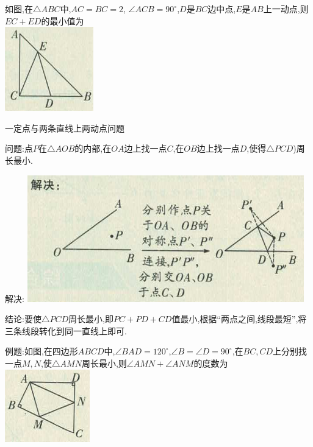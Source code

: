 \documentclass[cn,blue,12pt]{elegantbook}
\renewcommand \tkt[1]{{\CJKunderline[hidden=true, skip=true, thickness=1pt]{#1}}}
\begin{document}
\begin{zsyd}
\begin{zsyd}
    \item 如图,在\( \triangle ABC \)中,\(AC = BC = 2\), \(\angle ACB=90^\circ\),\(D\)是\(BC\)边中点,\(E\)是\(AB\)上一动点,则\(EC + ED\)的最小值为\tkt{\qquad}\\
        \includegraphics[width=0.3\linewidth]{pic/20200518005.png}
    \end{zsyd}
\item 一定点与两条直线上两动点问题
    \begin{zsyd}
    \item 问题:点\(P\)在\(\triangle AOB\)的内部,在\(OA\)边上找一点\(C\),在\(OB\)边上找一点\(D\),使得\(\triangle PCD\))周长最小.
    \item 解决:
        \includegraphics[width=0.6\linewidth]{pic/20200518003.png}
    \item 结论:要使\(\triangle PCD\)周长最小,即\(PC + PD + CD\)值最小,根据“两点之间,线段最短”,将三条线段转化到同一直线上即可.
    \item 例题:如图,在四边形\(ABCD\)中,\(\angle BAD = 120^\circ\),\(\angle B = \angle D=90^\circ\),在\(BC,CD\)上分别找一点\(M,N\),使\(\triangle AMN\)周长最小,则\(\angle AMN +\angle ANM\)的度数为\tkt{\(\qquad\)}\\
        \includegraphics[width=0.3\linewidth]{pic/20200518006.png}
    \end{zsyd}
\end{zsyd}
\end{document}
